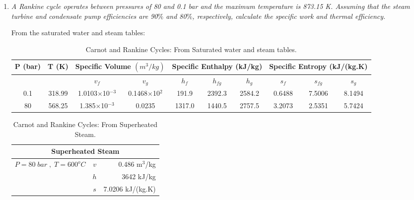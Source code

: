 \documentclass[12pts,a4paper,amsmath,amssymb,floatfix]{article}%
\begin{document}
\begin{enumerate}[label=\bfseries Example \arabic*]
\item {\it A Rankine cycle operates between pressures of 80 and 0.1 bar and the maximum temperature is 873.15 K. Assuming that the steam turbine and condensate pump efficiencies are 90$\%$ and 80$\%$, respectively, calculate the specific work and thermal efficiency.}\label{Example_01_02}

From the saturated water and steam tables:

\begin{center}
\begin{table}[h]
\begin{tabular}{||c|c|c c|c c c|c c c||} 
\hline\hline
{\bf P (bar)} & {\bf T (K)} & \multicolumn{2}{|c|}{{\bf Specific Volume $\left(m^{3}/kg\right)$}} & \multicolumn{3}{|c|}{{\bf Specific Enthalpy (kJ/kg)}} & \multicolumn{3}{|c||}{{\bf Specific Entropy (kJ/(kg.K)}}  \\
\hline
              &             &  $v_{f}$                  &    $v_{g}$                              &  $h_{f}$    &  $h_{fg}$  &   $h_{g}$                 &  $s_{f}$  &  $s_{fg}$    &  $s_{g}$  \\
\hline\hline
0.1           & 318.99      &1.0103$\times$10$^{-3}$    & 0.1468$\times$10$^{2}$                  & 191.9   & 2392.3    & 2584.2              & 0.6488 & 7.5006  & 8.1494 \\
80            & 568.25      &1.385$\times$10$^{-3}$     & 0.0235                                  & 1317.0 & 1440.5   & 2757.5               & 3.2073 & 2.5351  & 5.7424  \\
\hline\hline
\end{tabular}
\caption{Carnot and Rankine Cycles: From Saturated water and steam tables.}
\label{Example01_01:Table2}
\end{table}
\end{center}


\begin{table}[h]
\begin{center}
\begin{tabular}{c c r}
\multicolumn{3}{c}{Superheated Steam} \\
\hline
\multirow{3}{*}{$P=80\;bar\;,\;T= 600^{o}C$} & $v$ & 0.486 m$^{3}$/kg \\
                           & $h$ & 3642 kJ/kg \\
                           & $s$ & 7.0206 kJ/(kg.K)\\
\hline
\end{tabular}
\end{center}
\caption{Carnot and Rankine Cycles: From Superheated Steam.}
\label{Example01_01:Table23}
\end{table}


\end{enumerate}
\end{document}
